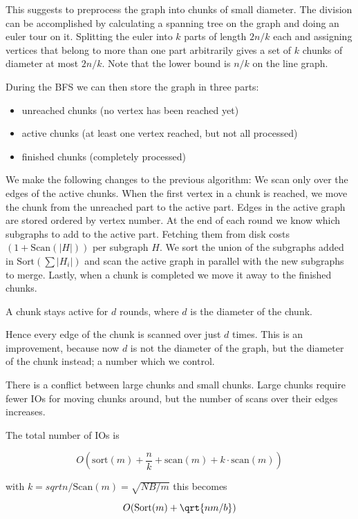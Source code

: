 This suggests to preprocess the graph into chunks of small diameter. The division can be accomplished by calculating a spanning tree on the graph and doing an euler tour on it. Splitting the euler into $k$ parts of length $2n/k$ each and assigning vertices that belong to more than one part arbitrarily gives a set of $k$ chunks of diameter at most $2n/k$. Note that the lower bound is $n/k$ on the line graph.

During the BFS we can then store the graph in three parts:

\begin{itemize}
\item unreached chunks (no vertex has been reached yet)
\item active chunks (at least one vertex reached, but not all processed)
\item finished chunks (completely processed)
\end{itemize}

We make the following changes to the previous algorithm: We scan only over the edges of the active chunks. When the first vertex in a chunk is reached, we move the chunk from the unreached part to the active part. Edges in the active graph are stored ordered by vertex number. At the end of each round we know which subgraphs to add to the active part. Fetching them from disk costs $(1+\text{Scan}(|H|))$ per subgraph $H$. We sort the union of the subgraphs added in $\text{Sort}(\sum |H_i|)$ and scan the active graph in parallel with the new subgraphs to merge. Lastly, when a chunk is completed we move it away to the finished chunks.

\begin{lem} A chunk stays active for $d$ rounds, where $d$ is the diameter of the chunk.
\end{lem}

Hence every edge of the chunk is scanned over just $d$ times. This is an improvement, because now $d$ is not the diameter of the graph, but the diameter of the chunk instead; a number which we control.

There is a conflict between large chunks and small chunks. Large chunks require fewer IOs for moving chunks around, but the number of scans over their edges increases.


\begin{thm} The total number of IOs is

\[O(\text{sort}(m) + \frac nk + \text{scan}(m) + k\cdot \text{scan}(m))\]

with $k= sqrt{n}/\text{Scan}(m) = \sqrt{NB/m}$ this becomes

\[O(\text{Sort}(m) + \qrt{nm/b})\]
\end{thm}
